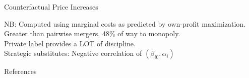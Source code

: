 \documentclass[aspectratio=169,10pt]{beamer}
\begin{document}
\begin{frame}[plain, label=merger]{Counterfactual Price Increases}
\begin{center}
\scalebox{0.75}{

}
\end{center}
\vspace{1cm}
NB: Computed using marginal costs as predicted by own-profit maximization.\\
Greater than pairwise mergers, 48\% of way to monopoly.\\
Private label provides a LOT of discipline.\\
Strategic substitutes: Negative correlation of $(\beta_{i0}, \alpha_{i})$
\end{frame}

\appendix

\begin{frame}{References}
    
\end{frame}
\end{document}
